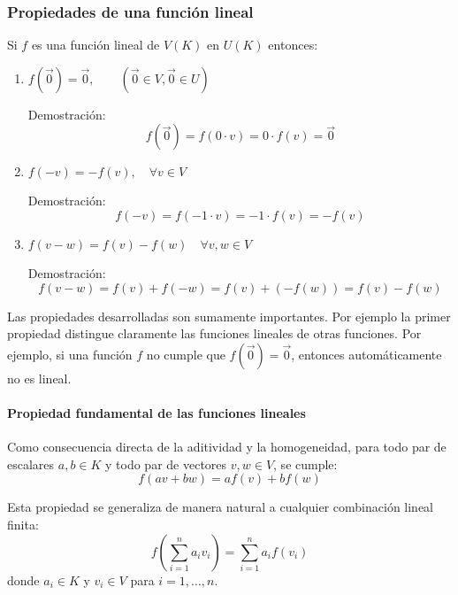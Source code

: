 \subsubsection{Propiedades de una función lineal}

Si \(f\) es una función lineal de \(V(K)\) en \(U(K)\) entonces:
\begin{enumerate}
  \item \(f\left(\vec{0}\right) = \vec{0}, \qquad \left(\vec{0} \in V,\vec{0} \in U\right)\)

  Demostración:\[
    f\left(\vec{0}\right) = f\left(0 \cdot v\right) = 0 \cdot f(v) = \vec{0}
  \]
  \item \(f(-v)=-f(v), \quad \forall v \in V\)
  
  Demostración: \[
    f(-v) = f(-1 \cdot v) = -1 \cdot f(v) = -f(v)
  \]
  \item \(f(v-w)=f(v) - f(w) \quad \forall v,w \in V\)
  
  Demostración: \[
    f(v-w) = f(v) + f(-w) = f(v) + (-f(w)) = f(v) - f(w)
  \]
\end{enumerate}

\begin{tcolorbox}[interesting_data, title=Nota conceptual]
  Las propiedades desarrolladas son sumamente importantes. Por ejemplo la primer propiedad distingue claramente las funciones lineales de otras funciones. Por ejemplo, si una función \(f\) no cumple que \(f\left(\vec{0}\right) = \vec{0}\), entonces automáticamente no es lineal.
\end{tcolorbox}

\paragraph{Propiedad fundamental de las funciones lineales}

Como consecuencia directa de la aditividad y la homogeneidad, para todo par de escalares \(a, b \in K\) y todo par de vectores \(v, w \in V\), se cumple:
\begin{equation}
  f(av + bw) = a f(v) + b f(w)
  \label{eq:lineal_combinacion_binaria}
\end{equation}

Esta propiedad se generaliza de manera natural a cualquier combinación lineal finita:
\begin{equation}
  f\left( \sum_{i=1}^n a_i v_i \right) = \sum_{i=1}^n a_i f(v_i)
  \label{eq:lineal_combinacion_general}
\end{equation}
donde \(a_i \in K\) y \(v_i \in V\) para \(i = 1, \ldots, n\).

